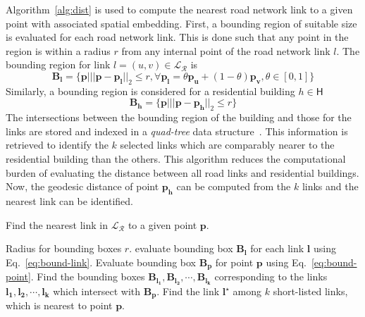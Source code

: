 \documentclass[sigconf]{acmart}
\begin{document}
Algorithm~\ref{alg:dist} is used to compute the nearest road network link to a given point with associated spatial embedding. First, a bounding region of suitable size is evaluated for each road network link. This is done such that any point in the region is within a radius $r$ from any internal point of the road network link $l$. The bounding region for link $l=(u,v)\in\mathcal{L_R}$ is
\begin{equation}
	\mathbf{B_l}=\big\{\mathbf{p}\big|||\mathbf{p}-\mathbf{p_l}||_2\leq r,\forall \mathbf{p_l}=\theta\mathbf{p_u}+(1-\theta)\mathbf{p_v},\theta\in[0,1]\big\}\label{eq:bound-link}
\end{equation}
Similarly, a bounding region is considered for a residential building $h\in\mathsf{H}$
\begin{equation}
	\mathbf{B_h}=\big\{\mathbf{p}\big|||\mathbf{p}-\mathbf{p_h}||_2\leq r\big\}\label{eq:bound-point}
\end{equation}
The intersections between the bounding region of the building and those for the links are stored and indexed in a \emph{quad-tree} data structure~\cite{quadtree1974}. This information is retrieved to identify the $k$ selected links which are comparably nearer to the residential building than the others. This algorithm reduces the computational burden of evaluating the distance between all road links and residential buildings. Now, the geodesic distance of point $\mathbf{p_h}$ can be computed from the $k$ links and the nearest link can be identified.
\begin{algorithm}
	\caption{Find the nearest link in $\mathcal{L_R}$ to a given point $\mathbf{p}$.}
	\label{alg:dist}
	\begin{algorithmic}[1]
		\REQUIRE Radius for bounding boxes $r$.
		\STATE evaluate bounding box $\mathbf{B_l}$ for each link $\mathbf{l}$ using Eq.~\ref{eq:bound-link}.
		\ENDFOR
		\STATE Evaluate bounding box $\mathbf{B_p}$ for point $\mathbf{p}$ using Eq.~\ref{eq:bound-point}.
		\STATE Find the bounding boxes $\mathbf{B_{l_1}},\mathbf{B_{l_2}},\cdots,\mathbf{B_{l_k}}$ corresponding to the links $\mathbf{l_1},\mathbf{l_2},\cdots,\mathbf{l_k}$ which intersect with $\mathbf{B_p}$.
		\STATE Find the link $\mathbf{l^\star}$ among $k$ short-listed links, which is nearest to point $\mathbf{p}$.
	\end{algorithmic}
\end{algorithm}
\end{document}
